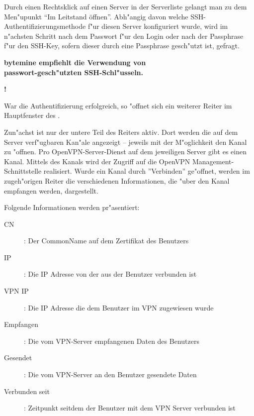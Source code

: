 \newpage
{}


\nl Durch einen Rechtsklick auf einen Server in der Serverliste gelangt man zu
dem Men"upunkt ``Im Leitstand \"offnen''. Abh"angig davon welche SSH-Authentifizierungsmethode
f"ur diesen Server konfiguriert wurde, wird im n"achsten Schritt nach dem Passwort
f"ur den Login oder nach der Passphrase f"ur den SSH-Key, sofern dieser durch eine
Passphrase gesch"utzt ist, gefragt.\\

\noindent
\begin{center}
 \parbox[b]{84mm}{\textbf{\small
  bytemine empfiehlt die Verwendung von\\
  passwort-gesch"utzten SSH-Schl"usseln.
 }}{\Huge\bfseries!}
\end{center}

\nl War die Authentifizierung erfolgreich, so "offnet sich ein
weiterer Reiter im Hauptfenster des \Nbm.

Zun"achst ist nur der untere Teil des Reiters aktiv. Dort werden die auf dem
Server verf"ugbaren Kan"ale angezeigt -- jeweils mit der M"oglichkeit
den Kanal zu "offnen.
%
Pro OpenVPN-Server-Dienst auf dem jeweiligen Server gibt es einen Kanal. Mittels
des Kanals wird der Zugriff auf die OpenVPN Management-Schnittstelle realisiert.
%
Wurde ein Kanal durch ''Verbinden'' ge"offnet, werden im zugeh"origen Reiter
die verschiedenen Informationen, die "uber den Kanal empfangen
werden, dargestellt.


\nl Folgende Informationen
werden pr"asentiert:

\begin{description}
	\item [CN]: Der CommonName auf dem Zertifikat des Benutzers
	\item [IP]: Die IP Adresse von der aus der Benutzer verbunden ist
	\item [VPN IP]: Die IP Adresse die dem Benutzer im VPN zugewiesen wurde
	\item [Empfangen]: Die vom VPN-Server empfangenen Daten des Benutzers
	\item [Gesendet]: Die vom VPN-Server an den Benutzer gesendete Daten
	\item [Verbunden seit]: Zeitpunkt seitdem der Benutzer mit
		dem VPN Server verbunden ist
\end{description}

